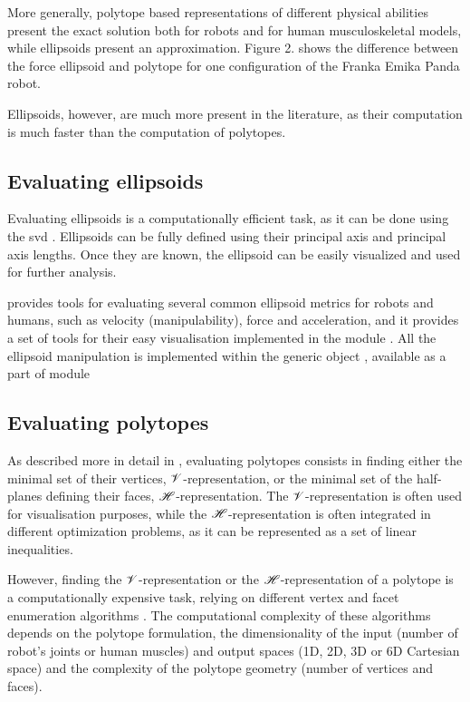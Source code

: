 More generally, polytope based representations of different physical abilities present the exact solution both for robots and for human musculoskeletal models, while ellipsoids present an approximation. 
Figure 2. shows the difference between the force ellipsoid and polytope \cite{chiacchio_evaluation_1996} for one configuration of the Franka Emika Panda robot.

Ellipsoids, however, are much more present in the literature, as their computation is much faster than the computation of polytopes. 

\subsection{Evaluating ellipsoids}

Evaluating ellipsoids is a computationally efficient task, as it can be done using the \gls{svd} \cite{yoshikawa1985manipulability}. Ellipsoids can be fully defined using their principal axis and principal axis lengths. Once they are known, the ellipsoid can be easily visualized and used for further analysis.

 provides tools for evaluating several common ellipsoid metrics for robots and humans, such as velocity (manipulability), force and acceleration, and it provides a set of tools for their easy visualisation implemented in the module . All the ellipsoid manipulation is implemented within the generic object , available as a part of  module

\subsection{Evaluating polytopes}
\label{sec:pycapacity_impelmented_polytopes}
As described more in detail in , evaluating polytopes consists in finding either the minimal set of their vertices, $\mathscr{V}$-representation, or the minimal set of the half-planes defining their faces, $\mathscr{H}$-representation. The $\mathscr{V}$-representation is often used for visualisation purposes, while the $\mathscr{H}$-representation is often integrated in different optimization problems, as it can be represented as a set of linear inequalities.

However, finding the $\mathscr{V}$-representation or the $\mathscr{H}$-representation of a polytope is a computationally expensive task, relying on different vertex and facet enumeration algorithms \cite{fukuda2004frequently}. The computational complexity of these algorithms depends on the polytope formulation, the dimensionality of the input (number of robot's joints or human muscles) and output spaces (1D, 2D, 3D or 6D Cartesian space) and the complexity of the polytope geometry (number of vertices and faces). 


